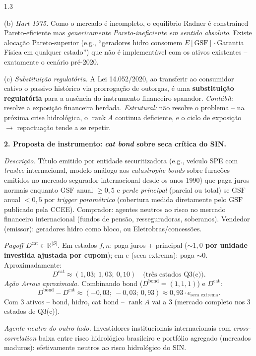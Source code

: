 \documentclass[11pt,addpoints]{exam}
\newcommand{\rank}{\operatorname{rank}}
\newcommand{\GSF}{\text{GSF}}
\begin{document}
\begin{spacing}{1.3}
\begin{questions}
\begin{solution}
(b) \emph{Hart 1975.} Como o mercado é incompleto, o equilíbrio Radner é constrained Pareto-eficiente mas \emph{genericamente Pareto-ineficiente em sentido absoluto}. Existe alocação Pareto-superior (e.g., ``geradores hidro consomem $E[\GSF]\cdot$Garantia Física em qualquer estado'') que não é implementável com os ativos existentes -- exatamente o cenário pré-2020.

(c) \emph{Substituição regulatória.} A Lei 14.052/2020, ao transferir ao consumidor cativo o passivo histórico via prorrogação de outorgas, é uma \textbf{substituição regulatória} para a ausência do instrumento financeiro spanador. \emph{Contábil:} resolve a exposição financeira herdada. \emph{Estrutural:} não resolve o problema -- na próxima crise hidrológica, o $\rank A$ continua deficiente, e o ciclo de exposição $\to$ repactuação tende a se repetir.

\textbf{2. Proposta de instrumento: \emph{cat bond} sobre seca crítica do SIN.}

\emph{Descrição.} Título emitido por entidade securitizadora (e.g., veículo SPE com \emph{trustee} internacional, modelo análogo aos \emph{catastrophe bonds} sobre furacões emitidos no mercado segurador internacional desde os anos 1990) que paga juros normais enquanto $\GSF$ anual $\geq 0{,}5$ e \emph{perde principal} (parcial ou total) se $\GSF$ anual $< 0{,}5$ por \emph{trigger paramétrico} (cobertura medida diretamente pelo $\GSF$ publicado pela CCEE). Comprador: agentes neutros ao risco no mercado financeiro internacional (fundos de pensão, resseguradoras, soberanos). Vendedor (emissor): geradores hidro como bloco, ou Eletrobras/concessões.

\emph{Payoff $D^{\text{cat}} \in \mathbb{R}^{|S|}$.} Em estados $f, n$: paga juros + principal (\textbf{$\sim 1{,}0$ por unidade investida ajustada por cupom}); em $e$ (seca extrema): paga $\sim 0$. Aproximadamente:
\[
    D^{\text{cat}} \approx (1{,}03;\ 1{,}03;\ 0{,}10) \quad \text{(três estados Q3(c))}.
\]
\emph{Ação Arrow aproximada.} Combinando bond ($D^{\text{bond}} = (1, 1, 1)$) e $D^{\text{cat}}$:
\[
    D^{\text{bond}} - D^{\text{cat}} \approx (-0{,}03;\ -0{,}03;\ 0{,}93) \approx 0{,}93\cdot e_{\text{seca extrema}}.
\]
Com 3 ativos -- bond, hidro, cat bond -- $\rank A$ vai a 3 (mercado completo nos 3 estados de Q3(c)).

\emph{Agente neutro do outro lado.} Investidores institucionais internacionais com \emph{cross-correlation} baixa entre risco hidrológico brasileiro e portfólio agregado (mercados maduros): efetivamente neutros ao risco hidrológico do SIN.


\end{solution}
\end{questions}
\end{spacing}
\end{document}
